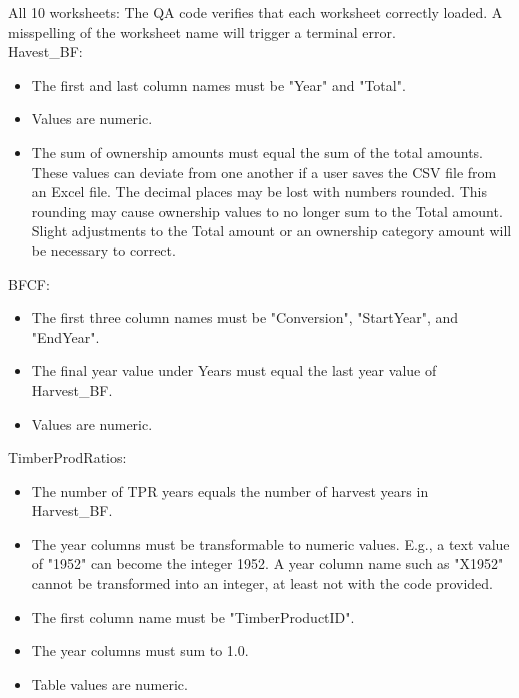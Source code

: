 \documentclass[
]{book}
\providecommand{\tightlist}{%
  \setlength{\itemsep}{0pt}\setlength{\parskip}{0pt}}
\begin{document}
All 10 worksheets: The QA code verifies that each worksheet correctly loaded. A misspelling of the worksheet name will trigger a terminal error.\\
Havest\_BF:

\begin{itemize}
\tightlist
\item
  The first and last column names must be "Year" and "Total".\\
\item
  Values are numeric.\\
\item
  The sum of ownership amounts must equal the sum of the total amounts. These values can deviate from one another if a user saves the CSV file from an Excel file. The decimal places may be lost with numbers rounded. This rounding may cause ownership values to no longer sum to the Total amount. Slight adjustments to the Total amount or an ownership category amount will be necessary to correct.
\end{itemize}

BFCF:

\begin{itemize}
\tightlist
\item
  The first three column names must be "Conversion", "StartYear", and "EndYear".\\
\item
  The final year value under Years must equal the last year value of Harvest\_BF.\\
\item
  Values are numeric.
\end{itemize}

TimberProdRatios:

\begin{itemize}
\tightlist
\item
  The number of TPR years equals the number of harvest years in Harvest\_BF.\\
\item
  The year columns must be transformable to numeric values. E.g., a text value of "1952" can become the integer 1952. A year column name such as "X1952" cannot be transformed into an integer, at least not with the code provided.\\
\item
  The first column name must be "TimberProductID".\\
\item
  The year columns must sum to 1.0.\\
\item
  Table values are numeric.
\end{itemize}
\end{document}
